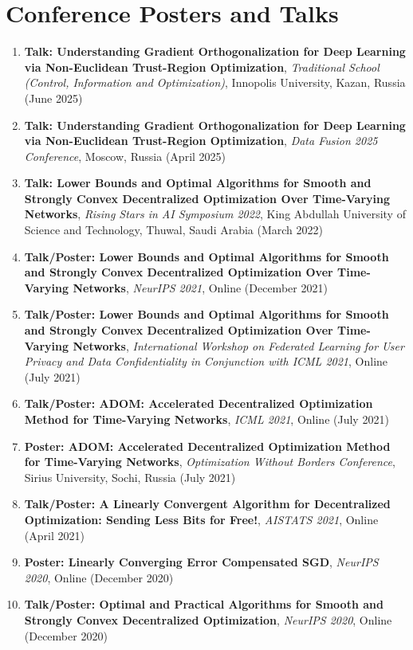 \section{Conference Posters and Talks}
\begin{enumerate}
  \item {\bf Talk: Understanding Gradient Orthogonalization for Deep Learning via Non-Euclidean Trust-Region Optimization}, {\em Traditional School (Control, Information and Optimization)}, Innopolis University, Kazan, Russia (June 2025)
  \item {\bf Talk: Understanding Gradient Orthogonalization for Deep Learning via Non-Euclidean Trust-Region Optimization}, {\em Data Fusion 2025 Conference}, Moscow, Russia (April 2025)
  \item {\bf Talk: Lower Bounds and Optimal Algorithms for Smooth and Strongly Convex Decentralized Optimization Over Time-Varying Networks}, {\em Rising Stars in AI Symposium 2022}, King Abdullah University of Science and Technology, Thuwal, Saudi Arabia (March 2022)
  \item {\bf Talk/Poster: Lower Bounds and Optimal Algorithms for Smooth and Strongly Convex Decentralized Optimization Over Time-Varying Networks}, {\em NeurIPS 2021}, Online (December 2021)
  \item {\bf Talk/Poster: Lower Bounds and Optimal Algorithms for Smooth and Strongly Convex Decentralized Optimization Over Time-Varying Networks}, {\em International Workshop on Federated Learning for User Privacy and Data Confidentiality in Conjunction with ICML 2021}, Online (July 2021)
  \item {\bf Talk/Poster: ADOM: Accelerated Decentralized Optimization Method for Time-Varying Networks}, {\em ICML 2021}, Online (July 2021)
  \item {\bf Poster: ADOM: Accelerated Decentralized Optimization Method for Time-Varying Networks}, {\em Optimization Without Borders Conference}, Sirius University, Sochi, Russia (July 2021)
  \item {\bf Talk/Poster: A Linearly Convergent Algorithm for Decentralized Optimization: Sending Less Bits for Free!}, {\em AISTATS 2021}, Online (April 2021)
  \item {\bf Poster: Linearly Converging Error Compensated SGD}, {\em NeurIPS 2020}, Online (December 2020)
  \item {\bf Talk/Poster: Optimal and Practical Algorithms for Smooth and Strongly Convex Decentralized Optimization}, {\em NeurIPS 2020}, Online (December 2020)

\end{enumerate}
